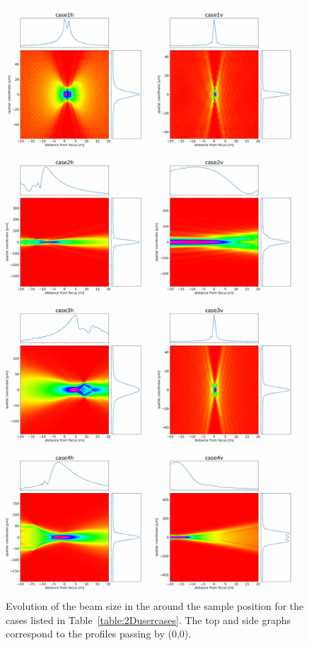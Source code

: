 \documentclass{iucr}              %
\begin{document}
\begin{figure}\label{fig:caustic}
\centering


\includegraphics[width=0.99\textwidth]{figures/fig_caustic.pdf}

\caption{Evolution of the beam size in the around the sample position for the cases listed in Table~\ref{table:2Dusercases}. The top and side graphs correspond to the profiles passing by (0,0).
}
\end{figure}
\end{document}
